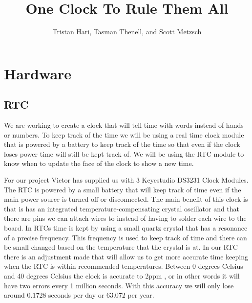\documentclass[10pt,draftclsnofoot,onecolumn]{IEEEtran}
\begin{document}
\title{One Clock To Rule Them All}
\author{Tristan Hari, Tasman Thenell, and Scott Metzsch}
\maketitle

\newpage
\section{Hardware}
\subsection{RTC}
We are working to create a clock that will tell time with words instead of hands or numbers. 
To keep track of the time we will be using a real time clock module that is powered by a battery to keep track of the time so that even if the clock loses power time will still be kept track of. 
We will be using the RTC module to know when to update the face of the clock to show a new time. 

For our project Victor has supplied us with 3 Keyestudio DS3231 Clock Modules. 
The RTC is powered by a small battery that will keep track of time even if the main power source is turned off or disconnected. 
The main benefit of this clock is that is has an integrated temperature-compensating crystal oscillator and that there are pins we can attach wires to instead of having to solder each wire to the board. 
In RTCs time is kept by using a small quartz crystal that has a resonance of a precise frequency. 
This frequency is used to keep track of time and there can be small changed based on the temperature that the crystal is at. 
In our RTC there is an adjustment made that will allow us to get more accurate time keeping when the RTC is within recommended temperatures. 
Between 0 degrees Celsius and 40 degrees Celsius the clock is accurate to 2ppm \cite{ksRTC}, or in other words it will have two errors every 1 million seconds. 
With this accuracy we will only lose around 0.1728 seconds per day or 63.072 per year. 
\end{document}
